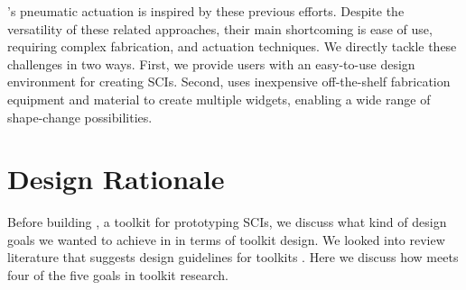       \mp's pneumatic actuation is inspired by these previous efforts. Despite
      the versatility of these related approaches, their main shortcoming is
      ease of use, requiring complex fabrication, and actuation techniques. We
      directly tackle these challenges in two ways. First, we provide users with
      an easy-to-use design environment for creating SCIs. Second, \mp uses
      inexpensive off-the-shelf fabrication equipment and material to create
      multiple widgets, enabling a wide range of shape-change possibilities.

  \section{Design Rationale} 
    Before building \mp, a toolkit for prototyping SCIs, we discuss what
    kind of design goals we wanted to achieve in \mp in terms of toolkit design.
    We looked into review literature that suggests design guidelines for
    toolkits \cite{Ledo:2018a}. Here we discuss how \mp meets four of the five
    goals in toolkit research.
      
